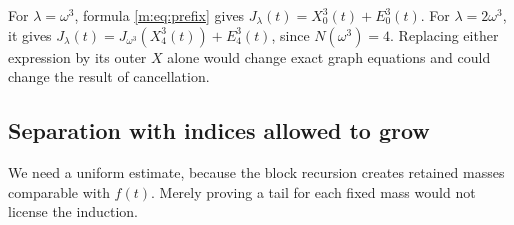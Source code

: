\begin{example}
For $\lambda=\omega^3$, formula \eqref{m:eq:prefix} gives
$J_\lambda(t)=X^3_0(t)+E^3_0(t)$. For $\lambda=2\omega^3$, it gives
$J_\lambda(t)=J_{\omega^3}(X^3_4(t))+E^3_4(t)$, since
$N(\omega^3)=4$. Replacing either expression by its outer $X$ alone would
change exact graph equations and could change the result of cancellation.
\end{example}

\subsection{Separation with indices allowed to grow}
We need a uniform estimate, because the block recursion creates retained
masses comparable with $f(t)$. Merely proving a tail for each fixed mass
would not license the induction.

